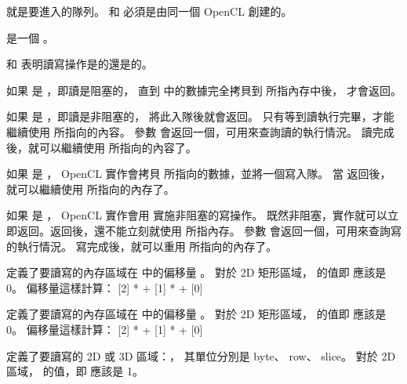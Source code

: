  就是要進入的隊列。
 和  必須是由同一個 OpenCL 創建的。

 是一個 。

 和 
表明讀寫操作是{}的還是{}的。

如果  是 ，即讀是阻塞的，
直到  中的數據完全拷貝到  所指內存中後，
 才會返回。

如果  是 ，即讀是非阻塞的，
 將此入隊後就會返回。
只有等到讀執行完畢，才能繼續使用  所指向的內容。
參數  會返回一個，可用來查詢讀的執行情況。
讀完成後，就可以繼續使用  所指向的內容了。

如果  是 ，
OpenCL 實作會拷貝  所指向的數據，並將一個寫入隊。
當  返回後，
就可以繼續使用  所指向的內存了。

如果  是 ，
OpenCL 實作會用  實施非阻塞的寫操作。
既然非阻塞，實作就可以立即返回。返回後，還不能立刻就使用  所指內存。
參數  會返回一個，可用來查詢寫的執行情況。
寫完成後，就可以重用  所指向的內存了。

 定義了要讀寫的內存區域在  中的偏移量 。
對於 2D 矩形區域， 的值即  應該是 0。
偏移量這樣計算：
\startformula \startalign
 \NC  \NC {}[2] *  \NR
 \NC + \NC {}[1] *  \NR
 \NC + \NC {}[0] \NR
\stopalign \stopformula

 定義了要讀寫的內存區域在  中的偏移量 。
對於 2D 矩形區域， 的值即  應該是 0。
偏移量這樣計算：
\startformula \startalign
 \NC  \NC {}[2] *  \NR
 \NC + \NC {}[1] *  \NR
 \NC + \NC {}[0] \NR
\stopalign \stopformula

 定義了要讀寫的 2D 或 3D 區域：，
其單位分別是 byte、 row、 slice。
對於 2D 區域，  的值，即  應該是 1。

